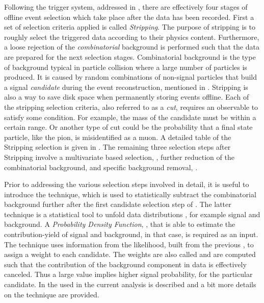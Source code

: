 
Following the trigger system, addressed in , there are effectively four stages of offline event
selection which take place after the data has been recorded.
First a set of selection criteria applied is called {\it Stripping}. The purpose of stripping is to roughly
select the triggered data according to their physics content. Furthermore, a loose rejection of the {\it combinatorial}
background is performed such that the data are prepared for the next selection stages.
Combinatorial background is the type of background typical in particle collision where a large number of
particles is produced. It is caused by random combinations of non-signal particles that build a signal
{\it candidate} during the event reconstruction, mentioned in .
Stripping is also a way to save disk space when permanently storing events offline.
Each of the stripping selection criteria, also referred to as a {\it cut},
requires an observable to satisfy some condition. For example, the mass of the \Bs candidate must be within
a certain range. Or another type of cut could be the probability that a final state particle, like the pion, is misidentified
as a muon. A detailed table of the Stripping selection is given in .
The remaining three selection steps after Stripping involve a multivariate based selection, ,
further reduction of the combinatorial background,  and specific background removal,
.

Prior to addressing the various selection steps involved in detail, it is useful to introduce the
\sPlot technique, which is used to statistically subtract the combinatorial background further after the first
candidate selection step of . The latter technique is a statistical
tool to unfold data distributions \cite{splot}, for example signal and background. A {\it Probability Density Function},
\pdf, that is able to estimate the contribution-yield of signal and background, in that case, is required as an input.
The \sPlot technique uses information from the likelihood, built from the previous \pdf, to assign a
weight to each candidate. The weights are also called {\sWeights} and are computed such that the contribution
of the background component in data is effectively canceled. Thus a large \sWeight value implies
higher signal probability, for the particular candidate. In  the \pdf
used in the current analysis is described and a bit more details on the \sPlot technique are provided.

